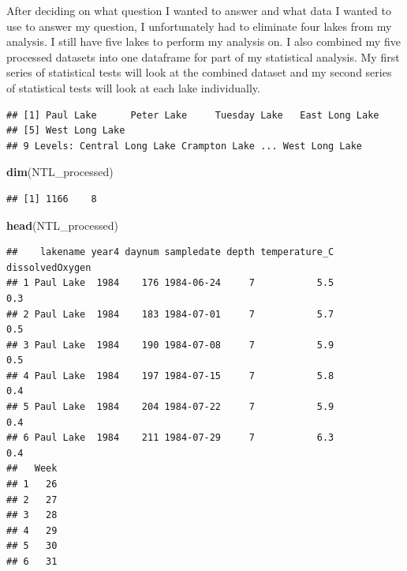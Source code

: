 \documentclass[12pt,]{article}
\newenvironment{Shaded}{\begin{snugshade}}{\end{snugshade}}
\newcommand{\KeywordTok}[1]{\textcolor[rgb]{0.13,0.29,0.53}{\textbf{#1}}}
\newcommand{\StringTok}[1]{\textcolor[rgb]{0.31,0.60,0.02}{#1}}
\newcommand{\OperatorTok}[1]{\textcolor[rgb]{0.81,0.36,0.00}{\textbf{#1}}}
\newcommand{\NormalTok}[1]{#1}
\begin{document}
After deciding on what question I wanted to answer and what data I
wanted to use to answer my question, I unfortunately had to eliminate
four lakes from my analysis. I still have five lakes to perform my
analysis on. I also combined my five processed datasets into one
dataframe for part of my statistical analysis. My first series of
statistical tests will look at the combined dataset and my second series
of statistical tests will look at each lake individually.

\begin{Shaded}
\end{Shaded}

\begin{verbatim}
## [1] Paul Lake      Peter Lake     Tuesday Lake   East Long Lake
## [5] West Long Lake
## 9 Levels: Central Long Lake Crampton Lake ... West Long Lake
\end{verbatim}

\begin{Shaded}
\begin{Highlighting}[]
\KeywordTok{dim}\NormalTok{(NTL_processed)}
\end{Highlighting}
\end{Shaded}

\begin{verbatim}
## [1] 1166    8
\end{verbatim}

\begin{Shaded}
\begin{Highlighting}[]
\KeywordTok{head}\NormalTok{(NTL_processed)}
\end{Highlighting}
\end{Shaded}

\begin{verbatim}
##    lakename year4 daynum sampledate depth temperature_C dissolvedOxygen
## 1 Paul Lake  1984    176 1984-06-24     7           5.5             0.3
## 2 Paul Lake  1984    183 1984-07-01     7           5.7             0.5
## 3 Paul Lake  1984    190 1984-07-08     7           5.9             0.5
## 4 Paul Lake  1984    197 1984-07-15     7           5.8             0.4
## 5 Paul Lake  1984    204 1984-07-22     7           5.9             0.4
## 6 Paul Lake  1984    211 1984-07-29     7           6.3             0.4
##   Week
## 1   26
## 2   27
## 3   28
## 4   29
## 5   30
## 6   31
\end{verbatim}
\end{document}
